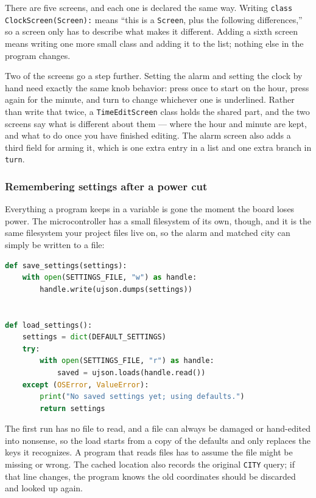 There are five screens, and each one is declared the same way. Writing
\texttt{class ClockScreen(Screen):} means ``this is a \texttt{Screen}, plus the following
differences,'' so a screen only has to describe what makes it different. Adding a sixth screen means
writing one more small class and adding it to the list; nothing else in the program changes.

Two of the screens go a step further. Setting the alarm and setting the clock by hand need exactly
the same knob behavior: press once to start on the hour, press again for the minute, and turn to
change whichever one is underlined. Rather than write that twice, a \texttt{TimeEditScreen} class
holds the shared part, and the two screens say what is different about them --- where the hour and
minute are kept, and what to do once you have finished editing. The alarm screen also adds a third
field for arming it, which is one extra entry in a list and one extra branch in \texttt{turn}.

\subsubsection{Remembering settings after a power cut}
Everything a program keeps in a variable is gone the moment the board loses power. The
microcontroller has a small filesystem of its own, though, and it is the same filesystem your
project files live on, so the alarm and matched city can simply be written to a file:

\begin{lstlisting}[language=Python, caption=Saving and loading settings]
def save_settings(settings):
    with open(SETTINGS_FILE, "w") as handle:
        handle.write(ujson.dumps(settings))


def load_settings():
    settings = dict(DEFAULT_SETTINGS)
    try:
        with open(SETTINGS_FILE, "r") as handle:
            saved = ujson.loads(handle.read())
    except (OSError, ValueError):
        print("No saved settings yet; using defaults.")
        return settings
\end{lstlisting}

The first run has no file to read, and a file can always be damaged or hand-edited into nonsense, so
the load starts from a copy of the defaults and only replaces the keys it recognizes. A program that
reads files has to assume the file might be missing or wrong. The cached location also records the
original \texttt{CITY} query; if that line changes, the program knows the old coordinates should be
discarded and looked up again.

